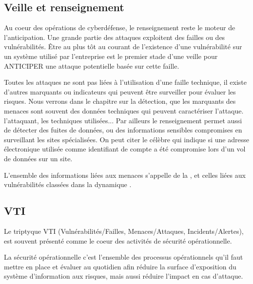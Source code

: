 \subsection{Veille et renseignement}

Au coeur des opérations de cyberdéfense, le renseignement reste le moteur de l'anticipation.  Une grande partie des attaques exploitent des failles ou des vulnérabilités. Être au plus tôt au courant de l'existence d'une vulnérabilité sur un système utilisé par l'entreprise est le premier stade d'une veille pour ANTICIPER une attaque potentielle basée sur cette faille.

Toutes les attaques ne sont pas liées à l'utilisation d'une faille technique, il existe d'autres marquants ou indicateurs qui peuvent être surveiller pour évaluer les risques. Nous verrons dans le chapitre sur la détection, que les marquants des menaces sont souvent des données techniques qui peuvent caractériser l'attaque. l'attaquant, les techniques utilisées...
Par ailleurs le renseignement permet aussi de détecter des fuites de données, ou des informations sensibles compromises en surveillant les sites spécialisées.
On peut citer le célèbre \textbf{} qui indique si une adresse électronique utilisée comme identifiant de compte a été compromise lors d'un vol de données sur un site. 

L'ensemble des informations liées aux menaces s'appelle de la , et celles liées aux vulnérabilités  classées dans la dynamique .


\subsection{VTI}


Le triptyque VTI (Vulnérabilités/Failles, Menaces/Attaques, Incidents/Alertes), est souvent présenté comme le coeur des activités de sécurité opérationnelle. 

La sécurité opérationnelle c’est l’ensemble des processus opérationnels qu’il faut mettre en place et évaluer au quotidien afin réduire la surface d’exposition du système d’information aux risques, mais aussi réduire l'impact en cas d'attaque. 

